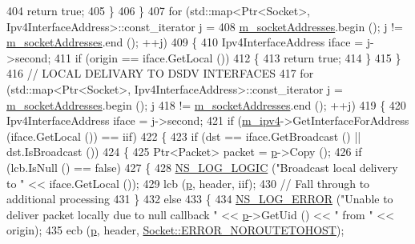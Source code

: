 \begin{DoxyCode}
404           \textcolor{keywordflow}{return} \textcolor{keyword}{true};
405         \}
406     \}
407   \textcolor{keywordflow}{for} (std::map<Ptr<Socket>, Ipv4InterfaceAddress>::const\_iterator j =
408          \hyperlink{classns3_1_1dsdv_1_1RoutingProtocol_a9f3be507604655079b145f063cf036fd}{m\_socketAddresses}.begin (); j != \hyperlink{classns3_1_1dsdv_1_1RoutingProtocol_a9f3be507604655079b145f063cf036fd}{m\_socketAddresses}.end (); ++j)
409     \{
410       Ipv4InterfaceAddress iface = j->second;
411       \textcolor{keywordflow}{if} (origin == iface.GetLocal ())
412         \{
413           \textcolor{keywordflow}{return} \textcolor{keyword}{true};
414         \}
415     \}
416   \textcolor{comment}{// LOCAL DELIVARY TO DSDV INTERFACES}
417   \textcolor{keywordflow}{for} (std::map<Ptr<Socket>, Ipv4InterfaceAddress>::const\_iterator j = 
      \hyperlink{classns3_1_1dsdv_1_1RoutingProtocol_a9f3be507604655079b145f063cf036fd}{m\_socketAddresses}.begin (); j
418        != \hyperlink{classns3_1_1dsdv_1_1RoutingProtocol_a9f3be507604655079b145f063cf036fd}{m\_socketAddresses}.end (); ++j)
419     \{
420       Ipv4InterfaceAddress iface = j->second;
421       \textcolor{keywordflow}{if} (\hyperlink{classns3_1_1dsdv_1_1RoutingProtocol_a955477c7f38e64762a264c24e3762af6}{m\_ipv4}->GetInterfaceForAddress (iface.GetLocal ()) == iif)
422         \{
423           \textcolor{keywordflow}{if} (dst == iface.GetBroadcast () || dst.IsBroadcast ())
424             \{
425               Ptr<Packet> packet = \hyperlink{lte__link__budget_8m_ac9de518908a968428863f829398a4e62}{p}->Copy ();
426               \textcolor{keywordflow}{if} (lcb.IsNull () == \textcolor{keyword}{false})
427                 \{
428                   \hyperlink{group__logging_ga88acd260151caf2db9c0fc84997f45ce}{NS\_LOG\_LOGIC} (\textcolor{stringliteral}{"Broadcast local delivery to "} << iface.GetLocal ());
429                   lcb (\hyperlink{lte__link__budget_8m_ac9de518908a968428863f829398a4e62}{p}, header, iif);
430                   \textcolor{comment}{// Fall through to additional processing}
431                 \}
432               \textcolor{keywordflow}{else}
433                 \{
434                   \hyperlink{group__logging_ga0261a8db1d4ac5f79417d117634fd455}{NS\_LOG\_ERROR} (\textcolor{stringliteral}{"Unable to deliver packet locally due to null callback "} << 
      \hyperlink{lte__link__budget_8m_ac9de518908a968428863f829398a4e62}{p}->GetUid () << \textcolor{stringliteral}{" from "} << origin);
435                   ecb (\hyperlink{lte__link__budget_8m_ac9de518908a968428863f829398a4e62}{p}, header, \hyperlink{classns3_1_1Socket_ada1328c5ae0c28cb2a982caf8f6d6ccaa0f8ecb5a4ddbce3bade35fa12c3d49e8}{Socket::ERROR\_NOROUTETOHOST});

\end{DoxyCode}

